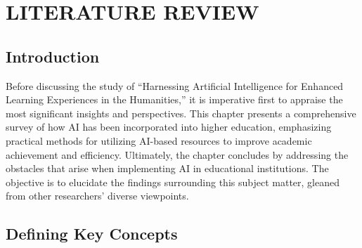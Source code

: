 \chapter{LITERATURE REVIEW}\label{ch:literature-review}
\section{Introduction}\label{sec:introduction}
\justifying
Before discussing the study of ``Harnessing Artificial Intelligence for Enhanced
Learning Experiences in the Humanities,'' it is imperative
first to appraise the most significant insights and perspectives. This chapter presents
a comprehensive survey of how AI has been incorporated into higher education, emphasizing
practical methods for utilizing AI-based resources to improve academic achievement and efficiency.
Ultimately, the chapter concludes by addressing the obstacles that arise when implementing AI in educational
institutions. The objective is to elucidate the findings surrounding this subject matter, gleaned from other
researchers' diverse viewpoints.



\section{Defining Key Concepts}
